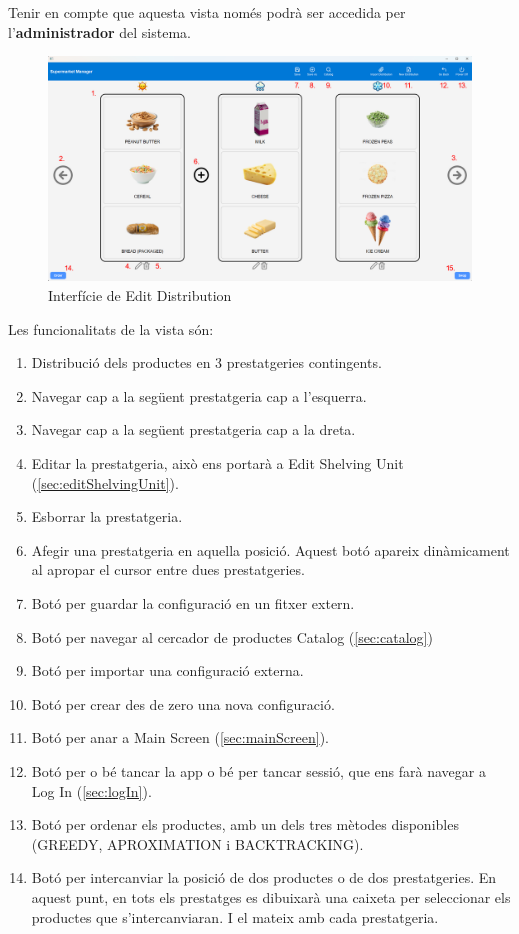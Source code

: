 \documentclass[a4paper,12pt]{article}
\begin{document}
	Tenir en compte que aquesta vista només podrà ser accedida per l'\textbf{administrador} del sistema.
	
	\begin{figure}[H] 
		\centering
		\includegraphics[width=0.75\linewidth]{assets/editdistribution.png}
		\caption{Interfície de Edit Distribution}
	\end{figure}
	
	\noindent Les funcionalitats de la vista són:
	
	\begin{enumerate}[itemsep=0pt, topsep=0pt]
		\item Distribució dels productes en 3 prestatgeries contingents.
		\item Navegar cap a la següent prestatgeria cap a l'esquerra.
		\item Navegar cap a la següent prestatgeria cap a la dreta.
		\item Editar la prestatgeria, això ens portarà a Edit Shelving Unit (\ref{sec:editShelvingUnit}).
		\item Esborrar la prestatgeria.
		\item Afegir una prestatgeria en aquella posició. Aquest botó apareix dinàmicament al apropar el cursor entre dues prestatgeries.
		\item Botó per guardar la configuració en un fitxer extern.
		\item Botó per navegar al cercador de productes Catalog (\ref{sec:catalog})
		\item Botó per importar una configuració externa.
		\item Botó per crear des de zero una nova configuració.
		\item Botó per anar a Main Screen (\ref{sec:mainScreen}).
		\item Botó per o bé tancar la app o bé per tancar sessió, que ens farà navegar a Log In (\ref{sec:logIn}).
		\item Botó per ordenar els productes, amb un dels tres mètodes disponibles (GREEDY, APROXIMATION i BACKTRACKING).
		\item Botó per intercanviar la posició de dos productes o de dos prestatgeries. En aquest punt, en tots els prestatges es dibuixarà una caixeta per seleccionar els productes que s'intercanviaran. I el mateix amb cada prestatgeria.
	\end{enumerate}
	
\end{document}

